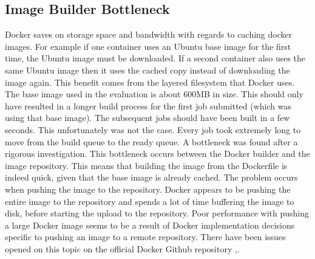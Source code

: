 \documentclass{sig-alternate-05-2015}
\begin{document}
%
%
%
\subsection{Image Builder Bottleneck}
Docker saves on storage space and bandwidth with regards to caching docker images. For example if one container uses an Ubuntu base image for the first time, the Ubuntu image must be downloaded. If a second container also uses the same Ubuntu image then it uses the cached copy instead of downloading the image again. This benefit comes from the layered filesystem that Docker uses. 
The base image used in the evaluation is about 600MB in size. This should only have resulted in a longer build process for the first job submitted (which was using that base image). The subsequent jobs should have been built in a few seconds. This unfortunately was not the case. Every job took extremely long to move from the build queue to the ready queue. A bottleneck was found after a rigorous investigation. This bottleneck occurs between the Docker builder and the image repository. This means that building the image from the Dockerfile is indeed quick, given that the base image is already cached. The problem occurs when pushing the image to the repository. Docker appears to be pushing the entire image to the repository and spends a lot of time buffering the image to disk, before starting the upload to the repository. Poor performance with pushing a large Docker image seems to be a result of Docker implementation decisions specific to pushing an image to a remote repository. There have been issues opened on this topic on the official Docker Github repository \cite{dockerpushperformance},\cite{dockercrossrepopush}.
\\\\
\end{document}

